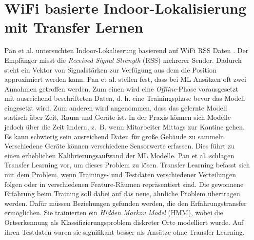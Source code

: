 \section{WiFi basierte Indoor-Lokalisierung mit Transfer Lernen}
Pan et al. untersuchten Indoor-Lokaliserung basierend auf WiFi RSS Daten \cite{pan2008transfer}.
Der Empfänger misst die \textit{Received Signal Strength} (RSS) mehrerer Sender.
Dadurch steht ein Vektor von Signalstärken zur Verfügung aus dem die Position approximiert werden kann.
\newline
\newline
Pan et al. stellen fest, dass bei ML Ansätzen oft zwei Annahmen getroffen werden.
Zum einen wird eine \textit{Offline}-Phase vorausgesetzt mit ausreichend beschrifteten Daten,
d. h. eine Trainingsphase bevor das Modell eingesetzt wird.
Zum anderen wird angenommen, dass das gelernte Modell statisch über Zeit, Raum und Geräte ist.
\newline
\newline
In der Praxis können sich Modelle jedoch über die Zeit ändern, z.~B. wenn Mitarbeiter Mittags zur Kantine gehen.
Es kann schwierig sein ausreichend Daten für große Gebäude zu sammeln.
Verschiedene Geräte können verschiedene Sensorwerte erfassen.
Dies führt zu einen erheblichen Kalibrierungsaufwand der ML Modelle.
\newline
\newline
Pan et al. schlagen Transfer Learning vor, um dieses Problem zu lösen.
Transfer Learning befasst sich mit dem Problem, wenn Trainings- und Testdaten verschiedener Verteilungen folgen oder in verschiedenen Feature-Räumen repräsentiert sind.
Die gewonnene Erfahrung beim Training soll dabei auf das neue, ähnliche Problem übertragen werden.
Dafür müssen Beziehungen gefunden werden, die den Erfahrungstransfer ermöglichen.
\newline
\newline
Sie trainierten ein \textit{Hidden Markov Model} (HMM), wobei die Ortserkennung als Klassifizierungsproblem diskreter Orte modelliert wurde.
Auf ihren Testdaten waren sie signifikant besser als Ansätze ohne Transfer Learning.
